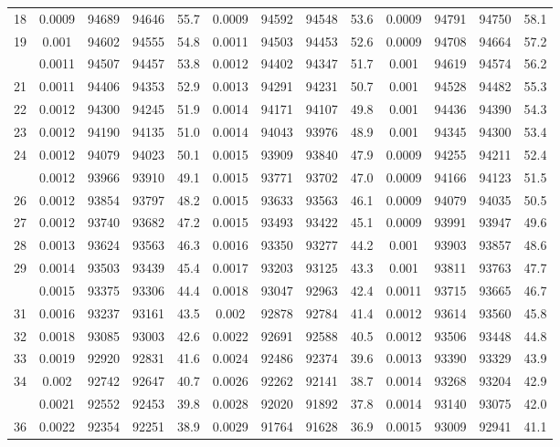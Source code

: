 \documentclass[
  14pt,
]{article}
\begin{document}
\begin{longtable}[t]{lcccccccccccc}
18 & 0.0009 & 94689 & 94646 & 55.7 & 0.0009 & 94592 & 94548 & 53.6 & 0.0009 & 94791 & 94750 & 58.1\\
19 & 0.001 & 94602 & 94555 & 54.8 & 0.0011 & 94503 & 94453 & 52.6 & 0.0009 & 94708 & 94664 & 57.2\\
\addlinespace
20 & 0.0011 & 94507 & 94457 & 53.8 & 0.0012 & 94402 & 94347 & 51.7 & 0.001 & 94619 & 94574 & 56.2\\
21 & 0.0011 & 94406 & 94353 & 52.9 & 0.0013 & 94291 & 94231 & 50.7 & 0.001 & 94528 & 94482 & 55.3\\
22 & 0.0012 & 94300 & 94245 & 51.9 & 0.0014 & 94171 & 94107 & 49.8 & 0.001 & 94436 & 94390 & 54.3\\
23 & 0.0012 & 94190 & 94135 & 51.0 & 0.0014 & 94043 & 93976 & 48.9 & 0.001 & 94345 & 94300 & 53.4\\
24 & 0.0012 & 94079 & 94023 & 50.1 & 0.0015 & 93909 & 93840 & 47.9 & 0.0009 & 94255 & 94211 & 52.4\\
\addlinespace
25 & 0.0012 & 93966 & 93910 & 49.1 & 0.0015 & 93771 & 93702 & 47.0 & 0.0009 & 94166 & 94123 & 51.5\\
26 & 0.0012 & 93854 & 93797 & 48.2 & 0.0015 & 93633 & 93563 & 46.1 & 0.0009 & 94079 & 94035 & 50.5\\
27 & 0.0012 & 93740 & 93682 & 47.2 & 0.0015 & 93493 & 93422 & 45.1 & 0.0009 & 93991 & 93947 & 49.6\\
28 & 0.0013 & 93624 & 93563 & 46.3 & 0.0016 & 93350 & 93277 & 44.2 & 0.001 & 93903 & 93857 & 48.6\\
29 & 0.0014 & 93503 & 93439 & 45.4 & 0.0017 & 93203 & 93125 & 43.3 & 0.001 & 93811 & 93763 & 47.7\\
\addlinespace
30 & 0.0015 & 93375 & 93306 & 44.4 & 0.0018 & 93047 & 92963 & 42.4 & 0.0011 & 93715 & 93665 & 46.7\\
31 & 0.0016 & 93237 & 93161 & 43.5 & 0.002 & 92878 & 92784 & 41.4 & 0.0012 & 93614 & 93560 & 45.8\\
32 & 0.0018 & 93085 & 93003 & 42.6 & 0.0022 & 92691 & 92588 & 40.5 & 0.0012 & 93506 & 93448 & 44.8\\
33 & 0.0019 & 92920 & 92831 & 41.6 & 0.0024 & 92486 & 92374 & 39.6 & 0.0013 & 93390 & 93329 & 43.9\\
34 & 0.002 & 92742 & 92647 & 40.7 & 0.0026 & 92262 & 92141 & 38.7 & 0.0014 & 93268 & 93204 & 42.9\\
\addlinespace
35 & 0.0021 & 92552 & 92453 & 39.8 & 0.0028 & 92020 & 91892 & 37.8 & 0.0014 & 93140 & 93075 & 42.0\\
36 & 0.0022 & 92354 & 92251 & 38.9 & 0.0029 & 91764 & 91628 & 36.9 & 0.0015 & 93009 & 92941 & 41.1\\

\end{longtable}
\end{document}
